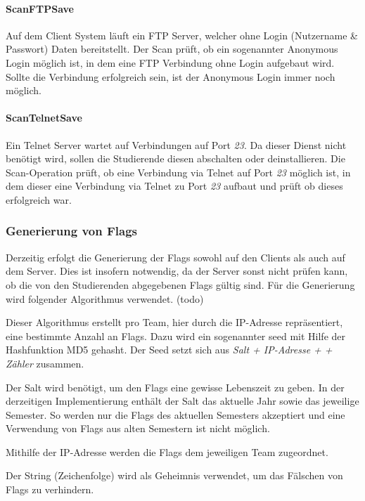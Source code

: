 \paragraph{ScanFTPSave}\label{para:ScanFTPSave}
Auf dem Client System läuft ein FTP Server, welcher ohne Login (Nutzername \& Passwort) Daten bereitstellt. Der Scan prüft, ob ein sogenannter Anonymous Login möglich ist, in dem eine FTP Verbindung ohne Login aufgebaut wird. Sollte die Verbindung erfolgreich sein, ist der Anonymous Login immer noch möglich.

\paragraph{ScanTelnetSave}\label{para:ScanTelnetSave}
Ein Telnet Server wartet auf Verbindungen auf Port \textit{23}. Da dieser Dienst nicht benötigt wird, sollen die Studierende diesen abschalten oder deinstallieren. Die Scan-Operation prüft, ob eine Verbindung via Telnet auf Port \textit{23} möglich ist, in dem dieser eine Verbindung via Telnet zu Port \textit{23} aufbaut und prüft ob dieses erfolgreich war.

\subsubsection{Generierung von Flags}\label{subsubsec:Generierung_von_Flags}

Derzeitig erfolgt die Generierung der Flags sowohl auf den Clients als auch auf dem Server. Dies ist insofern notwendig, da der Server sonst nicht prüfen kann, ob die von den Studierenden abgegebenen Flags gültig sind. Für die Generierung wird folgender Algorithmus verwendet. (todo)

Dieser Algorithmus erstellt pro Team, hier durch die IP-Adresse repräsentiert, eine bestimmte Anzahl an Flags. Dazu wird ein sogenannter seed mit Hilfe der Hashfunktion MD5 gehasht. Der Seed setzt sich aus \textit{Salt + IP-Adresse +  + Zähler} zusammen.

Der Salt wird benötigt, um den Flags eine gewisse Lebenszeit zu geben. In der derzeitigen Implementierung enthält der Salt das aktuelle Jahr sowie das jeweilige Semester. So werden nur die Flags des aktuellen Semesters akzeptiert und eine Verwendung von Flags aus alten Semestern ist nicht möglich.

Mithilfe der IP-Adresse werden die Flags dem jeweiligen Team zugeordnet.

Der String (Zeichenfolge)  wird als Geheimnis verwendet, um das Fälschen von Flags zu verhindern.

